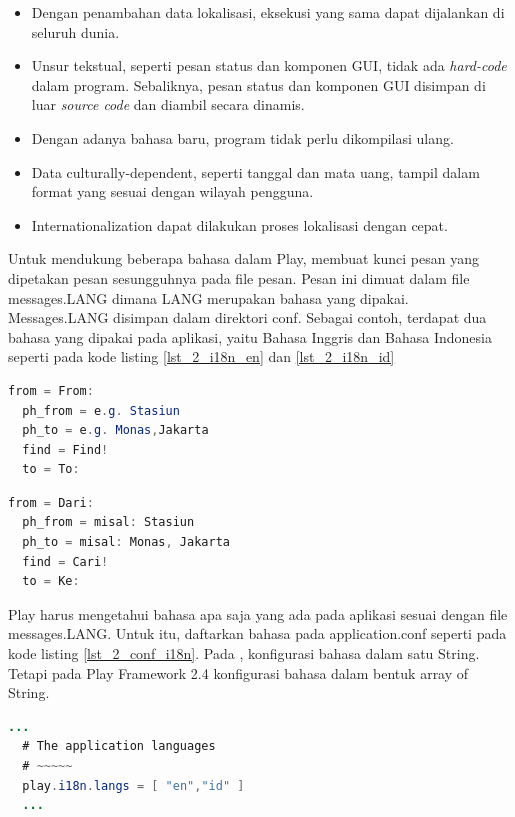 \documentclass[a4paper,twoside]{article}
\begin{document}
\begin{enumerate}
\begin{itemize}
  \item Dengan penambahan data lokalisasi, eksekusi yang sama dapat dijalankan di seluruh dunia.
  \item Unsur tekstual, seperti pesan status dan komponen GUI, tidak ada \textit{hard-code} dalam program. Sebaliknya, pesan status dan komponen GUI disimpan di luar \textit{source code} dan diambil secara dinamis.
  \item Dengan adanya bahasa baru, program tidak perlu dikompilasi ulang.
  \item Data culturally-dependent, seperti tanggal dan mata uang, tampil dalam format yang sesuai dengan wilayah pengguna.
  \item Internationalization dapat dilakukan proses lokalisasi dengan cepat.
\end{itemize}

Untuk mendukung beberapa bahasa dalam Play, membuat kunci pesan yang dipetakan pesan sesungguhnya pada file pesan. Pesan ini dimuat dalam file messages.LANG dimana LANG merupakan bahasa yang dipakai. Messages.LANG disimpan dalam direktori conf. Sebagai contoh, terdapat dua bahasa yang dipakai pada aplikasi, yaitu Bahasa Inggris dan Bahasa Indonesia seperti pada kode listing \ref{lst_2_i18n_en} dan \ref{lst_2_i18n_id}

\begin{lstlisting}[caption=Contoh messages.en untuk i18n,label = {lst_2_i18n_en},language=Java]
  from = From:
  ph_from = e.g. Stasiun
  ph_to = e.g. Monas,Jakarta
  find = Find!
  to = To:
\end{lstlisting}

\begin{lstlisting}[caption=Contoh messages.id untuk i18n,label = {lst_2_i18n_id},language=Java]
  from = Dari:
  ph_from = misal: Stasiun
  ph_to = misal: Monas, Jakarta
  find = Cari!
  to = Ke:
\end{lstlisting}

Play harus mengetahui bahasa apa saja yang ada pada aplikasi sesuai dengan file messages.LANG. Untuk itu, daftarkan bahasa pada application.conf seperti pada kode listing \ref{lst_2_conf_i18n}. Pada \cite{playforjava}, konfigurasi bahasa dalam satu String. Tetapi pada Play Framework 2.4 konfigurasi bahasa dalam bentuk array of String.

\begin{lstlisting}[caption=Konfigurasi Bahasa i18n,label = {lst_2_conf_i18n},language=Java]
  ...
  # The application languages
  # ~~~~~
  play.i18n.langs = [ "en","id" ]
  ...
\end{lstlisting}


\end{enumerate}
\end{document}
